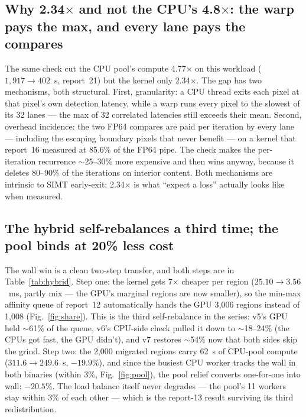 \documentclass[
	english,
	letterpaper, oneside
]{article}
\begin{document}
\subsection{Why 2.34$\times$ and not the CPU's 4.8$\times$: the warp pays
the max, and every lane pays the compares}

The same check cut the CPU pool's compute 4.77$\times$ on this workload
($1{,}917 \to 402$~s, report~21) but the kernel only 2.34$\times$. The gap
has two mechanisms, both structural. First, granularity: a CPU thread exits
each pixel at that pixel's own detection latency, while a warp runs every
pixel to the slowest of its 32 lanes --- the max of 32 correlated
latencies still exceeds their mean. Second, overhead incidence: the two
FP64 compares are paid per iteration by every lane --- including the
escaping boundary pixels that never benefit --- on a kernel that report~16
measured at 85.6\% of the FP64 pipe. The check makes the per-iteration
recurrence $\sim$25--30\% more expensive and then wins anyway, because it
deletes 80--90\% of the iterations on interior content. Both mechanisms
are intrinsic to SIMT early-exit; 2.34$\times$ is what ``expect a loss''
actually looks like when measured.

\subsection{The hybrid self-rebalances a third time; the pool binds at 20\%
less cost}

The wall win is a clean two-step transfer, and both steps are in
Table~\ref{tab:hybrid}. Step one: the kernel gets 7$\times$ cheaper per
region ($25.10 \to 3.56$~ms, partly mix --- the GPU's marginal regions are
now smaller), so the min-max affinity queue of report~12 automatically
hands the GPU 3,006 regions instead of 1,008 (Fig.~\ref{fig:share}). This
is the third self-rebalance in the series: v5's GPU held $\sim$61\% of the
queue, v6's CPU-side check pulled it down to $\sim$18--24\% (the CPUs got
fast, the GPU didn't), and v7 restores $\sim$54\% now that both sides skip
the grind. Step two: the 2{,}000 migrated regions carry 62~s of CPU-pool
compute ($311.6 \to 249.6$~s, $-19.9\%$), and since the busiest CPU worker
tracks the wall in both binaries (within 3\%, Fig.~\ref{fig:pool}), the
pool relief converts one-for-one into wall: $-20.5\%$. The load balance
itself never degrades --- the pool's 11 workers stay within 3\% of each
other --- which is the report-13 result surviving its third redistribution.
\end{document}
